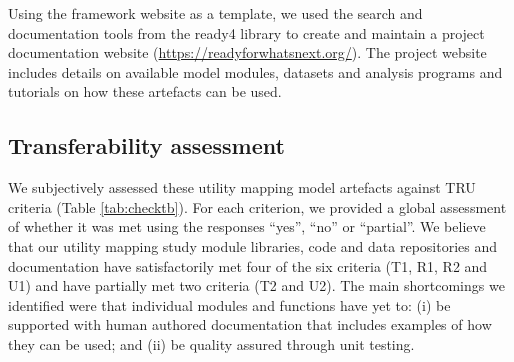 \documentclass[sn-vancouver,Numbered,pdflatex]{sn-jnl}
\theoremstyle{remark}
\theoremstyle{definition}
\begin{document}
Using the framework website as a template, we used the search and documentation tools from the ready4 library to create and maintain a project documentation website (\url{https://readyforwhatsnext.org/}). The project website includes details on available model modules, datasets and analysis programs and tutorials on how these artefacts can be used.

\hypertarget{transferability-assessment}{%
\subsection{Transferability assessment}\label{transferability-assessment}}

We subjectively assessed these utility mapping model artefacts against TRU criteria (Table \ref{tab:checktb}). For each criterion, we provided a global assessment of whether it was met using the responses ``yes'', ``no'' or ``partial''. We believe that our utility mapping study module libraries, code and data repositories and documentation have satisfactorily met four of the six criteria (T1, R1, R2 and U1) and have partially met two criteria (T2 and U2). The main shortcomings we identified were that individual modules and functions have yet to: (i) be supported with human authored documentation that includes examples of how they can be used; and (ii) be quality assured through unit testing.
\end{document}
